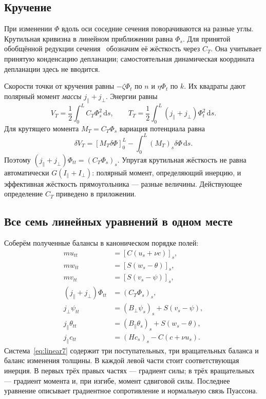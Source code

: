 \documentclass[11pt,a4paper]{article}
\newcommand{\dd}{\,\mathrm d}
\begin{document}
\subsection{Кручение}
При изменении $\Phi$ вдоль оси соседние сечения поворачиваются на разные углы. Крутильная кривизна в линейном приближении равна $\Phi_s$. Для принятой обобщённой редукции сечения~\cite{yartsev} обозначим её жёсткость через $C_T$. Она учитывает принятую конденсацию депланации; самостоятельная динамическая координата депланации здесь не вводится.

Скорости точки от кручения равны $-\zeta\Phi_t$ по $n$ и $\eta\Phi_t$ по $k$. Их квадраты дают полярный момент \emph{массы} $j_\parallel+j_\perp$. Энергии равны
\[
V_T=\frac12\int_0^L C_T\Phi_s^2\dd s,\qquad
T_T=\frac12\int_0^L(j_\parallel+j_\perp)\Phi_t^2\dd s.
\]
Для крутящего момента $M_T=C_T\Phi_s$ вариация потенциала равна
\[
\delta V_T=[M_T\delta\Phi]_0^L-\int_0^L(M_T)_s\delta\Phi\dd s.
\]
Поэтому $(j_\parallel+j_\perp)\Phi_{tt}=(C_T\Phi_s)_s$. Упругая крутильная жёсткость не равна автоматически $G(I_\parallel+I_\perp)$: полярный момент, определяющий инерцию, и эффективная жёсткость прямоугольника --- разные величины. Действующее определение $C_T$ приведено в приложении.

\subsection{Все семь линейных уравнений в одном месте}
Соберём полученные балансы в каноническом порядке полей:
\begin{equation}
\boxed{\begin{aligned}
mu_{tt}&=[C(u_s+\nu c)]_s,\\
mw_{tt}&=[S(w_s-\theta)]_s,\\
mv_{tt}&=[S(v_s-\psi)]_s,\\
(j_\parallel+j_\perp)\Phi_{tt}&=(C_T\Phi_s)_s,\\
j_\perp\psi_{tt}&=(B_\perp\psi_s)_s+S(v_s-\psi),\\
j_\parallel\theta_{tt}&=(B_\parallel\theta_s)_s+S(w_s-\theta),\\
j_\parallel c_{tt}&=(Hc_s)_s-C(c+\nu u_s).
\end{aligned}}
\label{eq:linear7}
\end{equation}
Система~\eqref{eq:linear7} содержит три поступательных, три вращательных баланса и баланс изменения толщины. В каждой левой части стоит соответствующая инерция. В первых трёх правых частях --- градиент силы; в трёх вращательных --- градиент момента и, при изгибе, момент сдвиговой силы. Последнее уравнение описывает градиентное сопротивление и нормальную связь Пуассона.
\end{document}
